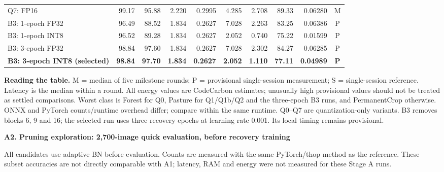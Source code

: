 \begin{center}
\begin{tabular*}{\textwidth}{@{\extracolsep{\fill}}lrrrrrrrrc@{}}
Q7: FP16 & 99.17 & 95.88 & 2.220 & 0.2995 & 4.285 & 2.708 & 89.33 & 0.06280 & M\\
B3: 1-epoch FP32 & 96.49 & 88.52 & 1.834 & 0.2627 & 7.028 & 2.263 & 83.25 & 0.06386 & P\\
B3: 1-epoch INT8 & 96.52 & 89.28 & 1.834 & 0.2627 & 2.052 & 0.740 & 75.22 & 0.01599 & P\\
B3: 3-epoch FP32 & 98.84 & 97.60 & 1.834 & 0.2627 & 7.028 & 2.302 & 84.27 & 0.06285 & P\\
\rowcolor{pale}\textbf{B3: 3-epoch INT8 (selected)} & \textbf{98.84} & \textbf{97.70} & \textbf{1.834} & \textbf{0.2627} & \textbf{2.052} & \textbf{1.110} & \textbf{77.11} & \textbf{0.04989} & \textbf{P}\\
\bottomrule
\end{tabular*}
\end{center}
\vspace{-4pt}
\noindent\footnotesize\textbf{Reading the table.} M = median of five milestone rounds; P = provisional single-session measurement; S = single-session reference. Latency is the median within a round. All energy values are CodeCarbon estimates; unusually high provisional values should not be treated as settled comparisons. Worst class is Forest for Q0, Pasture for Q1/Q1b/Q2 and the three-epoch B3 runs, and PermanentCrop otherwise. ONNX and PyTorch counts/runtime overhead differ; compare within the same runtime. Q0--Q7 are quantization-only variants. B3 removes blocks 6, 9 and 16; the selected run uses three recovery epochs at learning rate 0.001. Its local timing remains provisional.
\vspace{8pt}

\noindent\small\textbf{A2. Pruning exploration: 2,700-image quick evaluation, before recovery training}

\noindent\footnotesize All candidates use adaptive BN before evaluation. Counts are measured with the same PyTorch/thop method as the reference. These subset accuracies are not directly comparable with A1; latency, RAM and energy were not measured for these Stage A runs.
\vspace{4pt}

